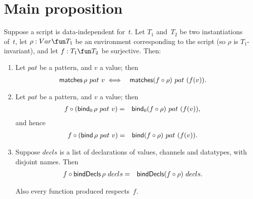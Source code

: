 


\section{Main proposition}

\begin{prop}
\label{prop:expressions-1}
Suppose a script is data-independent for~$t$.  Let $T_1$ and~$T_2$ be two
instantiations of~$t$, let $\rho: Var \fun T_1$ be an environment
corresponding to the script (so $\rho$ is $T_1$-invariant), and let $f : T_1
\fun T_2$ be surjective.  Then:
\begin{enumerate}
\item\label{item:matches} Let $pat$ be a pattern, and $v$ a value; then
\begin{eqnarray*}
  \mathop{\sf matches} \rho~ pat~v & \iff & \mathop{\sf matches} (f\circ\rho) ~ pat~(f(v)).
\end{eqnarray*}

\item\label{item:bind}
Let $pat$ be a pattern, and $v$ a value; then
\begin{eqnarray*}
f \circ (\mathop{\sf bind}\nolimits_0 \rho~pat~v) &  = & \mathop{\sf bind}\nolimits_0 (f\circ\rho)~pat~(f(v)),
\end{eqnarray*}
and hence
\begin{eqnarray*}
f \circ (\mathop{\sf bind}\nolimits \rho~pat~v) & = & \mathop{\sf bind}\nolimits (f\circ\rho)~pat~(f(v)).
\end{eqnarray*}

\item\label{item:bindDecls} Suppose $decls$ is a list of declarations of
  values, channels and datatypes, with disjoint names.  Then
  \begin{eqnarray*}
  f \circ \mathop{\sf bindDecls} \rho~decls & = & \mathop{\sf bindDecls} (f \circ \rho)~decls.
  \end{eqnarray*}

Also every function produced respects~$f$. 


%




\end{enumerate}
\end{prop}
